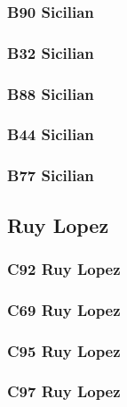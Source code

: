 \documentclass[]{book}
\begin{document}
\hypertarget{b90-sicilian}{%
\subsubsection{B90 Sicilian}\label{b90-sicilian}}

\hypertarget{b32-sicilian}{%
\subsubsection{B32 Sicilian}\label{b32-sicilian}}

\hypertarget{b88-sicilian}{%
\subsubsection{B88 Sicilian}\label{b88-sicilian}}

\hypertarget{b44-sicilian}{%
\subsubsection{B44 Sicilian}\label{b44-sicilian}}

\hypertarget{b77-sicilian}{%
\subsubsection{B77 Sicilian}\label{b77-sicilian}}

\hypertarget{ruy-lopez}{%
\subsection{Ruy Lopez}\label{ruy-lopez}}

\hypertarget{c92-ruy-lopez}{%
\subsubsection{C92 Ruy Lopez}\label{c92-ruy-lopez}}

\hypertarget{c69-ruy-lopez}{%
\subsubsection{C69 Ruy Lopez}\label{c69-ruy-lopez}}

\hypertarget{c95-ruy-lopez}{%
\subsubsection{C95 Ruy Lopez}\label{c95-ruy-lopez}}

\hypertarget{c97-ruy-lopez}{%
\subsubsection{C97 Ruy Lopez}\label{c97-ruy-lopez}}
\end{document}
